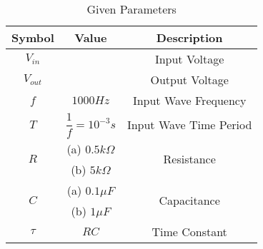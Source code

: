 \begin{table}[!h]
    \centering
    \begin{tabular}{|c|c|c|}
    \hline
       \textbf{Symbol}  & \textbf{Value} &  \textbf{Description}\\
    \hline
       $V_{in}$  &  &  Input Voltage\\
    \hline
        $V_{out}$ & & Output Voltage\\
    \hline
        $f$ & $1000Hz$ & Input Wave Frequency\\
    \hline
        $T$ & $\dfrac{1}{f} = 10^{-3} s$ & Input Wave Time Period\\
    \hline
        \multirow{2}{*}{$R$} & (a) $0.5k\Omega$ & \multirow{2}{*}{Resistance}\\
        \cline{2-2}
        & (b) $5k\Omega$ &\\
        \cline{2-2}
    \hline
        \multirow{2}{*}{$C$} & (a) $0.1\mu F$ & \multirow{2}{*}{Capacitance}\\
        \cline{2-2}
        & (b) $1\mu F$ &\\
        \cline{2-2}
    \hline
        $\tau$ & $RC$ & Time Constant\\
    \hline
    \end{tabular}
    \caption{Given Parameters}
    \label{tab:1_gate.23.ph.37}
\end{table}
